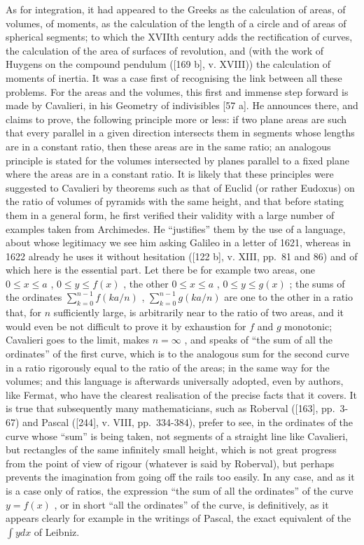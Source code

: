 As for integration, it had appeared to the Greeks as the calculation of areas, of volumes, of moments, as the calculation of the length of a circle and of areas of spherical segments; to which the XVIIth century adds the rectification of curves, the calculation of the area of surfaces of revolution, and (with the work of Huygens on the compound pendulum ({[}169 b{]}, v. XVIII)) the calculation of moments of inertia. It was a case first of recognising the link between all these problems. For the areas and the volumes, this first and immense step forward is made by Cavalieri, in his Geometry of indivisibles {[}57 a{]}. He announces there, and claims to prove, the following principle more or less: if two plane areas are such that every parallel in a given direction intersects them in segments whose lengths are in a constant ratio, then these areas are in the same ratio; an analogous principle is stated for the volumes intersected by planes parallel to a fixed plane where the areas are in a constant ratio. It is likely that these principles were suggested to Cavalieri by theorems such as that of Euclid (or rather Eudoxus) on the ratio of volumes of pyramids with the same height, and that before stating them in a general form, he first verified their validity with a large number of examples taken from Archimedes. He ``justifies'' them by the use of a language, about whose legitimacy we see him asking Galileo in a letter of 1621, whereas in 1622 already he uses it without hesitation ({[}122 b{]}, v. XIII, pp.~81 and 86) and of which here is the essential part. Let there be for example two areas, one \(0 \leq x \leq a\) , \(0 \leq y \leq f(x)\) , the other \(0 \leq x \leq a\) , \(0 \leq y \leq g(x)\) ; the sums of the ordinates \(\sum_{k=0}^{n-1} f(ka/n)\) , \(\sum_{k=0}^{n-1} g(ka/n)\) are one to the other in a ratio that, for \(n\) sufficiently large, is arbitrarily near to the ratio of two areas, and it would even be not difficult to prove it by exhaustion for \(f\) and \(g\) monotonic; Cavalieri goes to the limit, makes \(n = \infty\) , and speaks of ``the sum of all the ordinates'' of the first curve, which is to the analogous sum for the second curve in a ratio rigorously equal to the ratio of the areas; in the same way for the volumes; and this language is afterwards universally adopted, even by authors, like Fermat, who have the clearest realisation of the precise facts that it covers. It is true that subsequently many mathematicians, such as Roberval ({[}163{]}, pp.~3-67) and Pascal ({[}244{]}, v. VIII, pp.~334-384), prefer to see, in the ordinates of the curve whose ``sum'' is being taken, not segments of a straight line like Cavalieri, but rectangles of the same infinitely small height, which is not great progress from the point of view of rigour (whatever is said by Roberval), but perhaps prevents the imagination from going off the rails too easily. In any case, and as it is a case only of ratios, the expression ``the sum of all the ordinates'' of the curve \(y = f(x)\) , or in short ``all the ordinates'' of the curve, is definitively, as it appears clearly for example in the writings of Pascal, the exact equivalent of the \(\int ydx\) of Leibniz.

